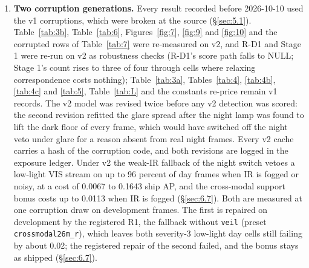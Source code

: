 \documentclass[10pt]{article}
\begin{document}
\begin{enumerate}
\item \textbf{Two corruption generations.} Every result recorded before 2026-10-10 used the v1 corruptions, which were broken at the source (\S\ref{sec:5.1}). Table~\ref{tab:3b}, Table~\ref{tab:6}, Figures~\ref{fig:7}, \ref{fig:9} and \ref{fig:10} and the corrupted rows of Table~\ref{tab:7} were re-measured on v2, and R-D1 and Stage 1 were re-run on v2 as robustness checks (R-D1's score path falls to NULL; Stage 1's count rises to three of four through cells where relaxing correspondence costs nothing); Table~\ref{tab:3a}, Tables~\ref{tab:4}, \ref{tab:4b}, \ref{tab:4c} and \ref{tab:5}, Table~\ref{tab:L} and the constants re-price remain v1 records. The v2 model was revised twice before any v2 detection was scored: the second revision refitted the glare spread after the night lamp was found to lift the dark floor of every frame, which would have switched off the night veto under glare for a reason absent from real night frames. Every v2 cache carries a hash of the corruption code, and both revisions are logged in the exposure ledger. Under v2 the weak-IR fallback of the night switch vetoes a low-light VIS stream on up to 96 percent of day frames when IR is fogged or noisy, at a cost of 0.0067 to 0.1643 ship AP, and the cross-modal support bonus costs up to 0.0113 when IR is fogged (\S\ref{sec:6.7}). Both are measured at one corruption draw on development frames. The first is repaired on development by the registered R1, the fallback without \texttt{veil} (preset \texttt{crossmodal26m\_\allowbreak{}r}), which leaves both severity-3 low-light day cells still failing by about 0.02; the registered repair of the second failed, and the bonus stays as shipped (\S\ref{sec:6.7}).
\end{enumerate}

\FloatBarrier
\end{document}
